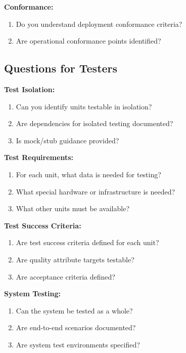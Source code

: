 \documentclass[11pt]{article}
\begin{document}
\begin{questionbox}
\textbf{Conformance:}
\begin{enumerate}[resume]
    \item Do you understand deployment conformance criteria?
    \item Are operational conformance points identified?
\end{enumerate}
\end{questionbox}

\subsection{Questions for Testers}

\begin{questionbox}

\textbf{Test Isolation:}
\begin{enumerate}
    \item Can you identify units testable in isolation?
    \item Are dependencies for isolated testing documented?
    \item Is mock/stub guidance provided?
\end{enumerate}

\textbf{Test Requirements:}
\begin{enumerate}[resume]
    \item For each unit, what data is needed for testing?
    \item What special hardware or infrastructure is needed?
    \item What other units must be available?
\end{enumerate}

\textbf{Test Success Criteria:}
\begin{enumerate}[resume]
    \item Are test success criteria defined for each unit?
    \item Are quality attribute targets testable?
    \item Are acceptance criteria defined?
\end{enumerate}

\textbf{System Testing:}
\begin{enumerate}[resume]
    \item Can the system be tested as a whole?
    \item Are end-to-end scenarios documented?
    \item Are system test environments specified?
\end{enumerate}
\end{questionbox}
\end{document}
